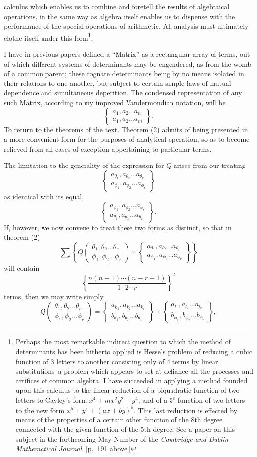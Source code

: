 \documentclass[11pt]{article}
\newcommand{\sourcepage}[1]{\marginpar{\scriptsize p.~#1}}
\newcommand{\bd}[2]{\left\{\begin{matrix}#1\\#2\end{matrix}\right\}}
\begin{document}
{{\sourcepage{247}
calculus which enables us to combine and foretell the results of algebraical operations, in the same way as algebra itself enables us to dispense with the performance of the special operations of arithmetic. All analysis must ultimately clothe itself under this form\footnote{Perhaps the most remarkable indirect question to which the method of determinants has been hitherto applied is Hesse's problem of reducing a cubic function of 3 letters to another consisting only of 4 terms by linear substitutions--a problem which appears to set at defiance all the processes and artifices of common algebra. I have succeeded in applying a method founded upon this calculus to the linear reduction of a biquadratic function of two letters to Cayley's form $x^4+mx^2y^2+y^4$, and of a $5^c$ function of two letters to the new form $x^5+y^5+(ax+by)^5$. This last reduction is effected by means of the properties of a certain other function of the 8th degree connected with the given function of the 5th degree. See a paper on this subject in the forthcoming May Number of the \emph{Cambridge and Dublin Mathematical Journal}. [p.~191 above.]}.

I have in previous papers defined a ``Matrix'' as a rectangular array of terms, out of which different systems of determinants may be engendered, as from the womb of a common parent; these cognate determinants being by no means isolated in their relations to one another, but subject to certain simple laws of mutual dependence and simultaneous deperition. The condensed representation of any such Matrix, according to my improved Vandermondian notation, will be
\[
\bd{a_1,a_2\ldots a_n}{a_1,a_2\ldots a_m}.
\]
To return to the theorems of the text. Theorem (2) admits of being presented in a more convenient form for the purposes of analytical operation, so as to become relieved from all cases of exception appertaining to particular terms.

The limitation to the generality of the expression for $Q$ arises from our treating
\[
\bd{a_{\theta_1},a_{\theta_2}\ldots a_{\theta_r}}{a_{\phi_1},a_{\phi_2}\ldots a_{\phi_r}}
\]
as identical with its equal,
\[
\bd{a_{\phi_1},a_{\phi_2}\ldots a_{\phi_r}}{a_{\theta_1},a_{\theta_2}\ldots a_{\theta_r}}.
\]
If, however, we now convene to treat these two forms as distinct, so that in theorem (2)
\[
\sum\left\{Q\left(\begin{matrix}\theta_1,\theta_2\ldots\theta_r\\ \phi_1,\phi_2\ldots\phi_r\end{matrix}\right)\times
\bd{a_{\theta_1},a_{\theta_2}\ldots a_{\theta_r}}{a_{\phi_1},a_{\phi_2}\ldots a_{\phi_r}}
\right\}
\]
will contain
\[
\left\{\frac{n(n-1)\cdots(n-r+1)}{1\cdot2\cdots r}\right\}^2
\]
terms, then we may write simply
\[
Q\left(\begin{matrix}\theta_1,\theta_2\ldots\theta_r\\ \phi_1,\phi_2\ldots\phi_r\end{matrix}\right)
=
\bd{a_{k_1},a_{k_2}\ldots a_{k_r}}{b_{\theta_1},b_{\theta_2}\ldots b_{\theta_r}}
\times
\bd{a_{l_1},a_{l_2}\ldots a_{l_r}}{b_{\phi_1},b_{\phi_2}\ldots b_{\phi_r}},
\]

}}
\end{document}
